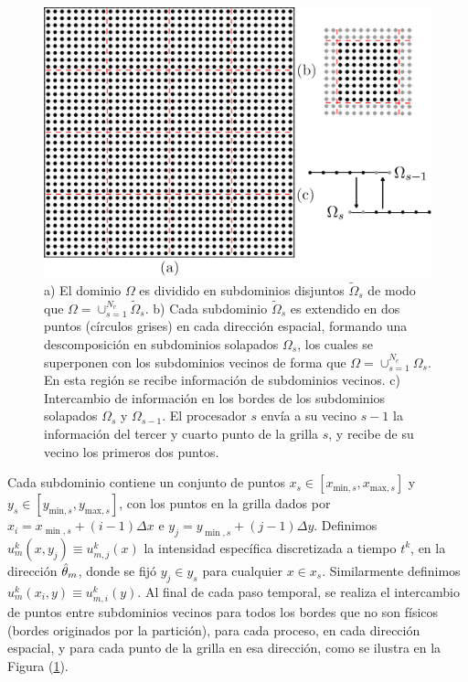 \begin{figure}[h!]
  \centering
  \includegraphics[width=0.6\linewidth]{figuras/all.png}
  \caption{a) El dominio $\Omega$ es dividido en subdominios disjuntos $\widetilde{\Omega}_s$ de modo que 
   $\Omega=\cup_{s=1}^{N_{c}}\widetilde{\Omega}_s$.
   b) Cada subdominio $\widetilde{\Omega}_s$ es extendido  
  en dos puntos (círculos grises) en cada dirección espacial, formando una descomposición en 
  subdominios solapados $\Omega_s$, los cuales se superponen con los subdominios vecinos 
  de forma que $\Omega=\cup_{s=1}^{N_{c}}\Omega_s$. 
  En esta región se recibe información de subdominios vecinos.
   c) Intercambio de información en los bordes de los subdominios solapados 
    $\Omega_s$ y $\Omega_{s-1}$. El 
   procesador $s$ envía a su vecino $s-1$ la información del tercer y cuarto punto de la grilla $s$, y 
   recibe de su vecino los primeros dos puntos.}
 \label{fig:bechange}
\end{figure}

 Cada subdominio contiene un conjunto de puntos  $x_s\in[x_{\text{min},s},x_{\text{max},s}]$ 
 y $y_s\in [y_{\text{min},s},y_{\text{max},s}]$, con los puntos 
 en la grilla dados por $x_i=x_{\min,s}+(i-1)\Delta x$ e $y_j=y_{\min,s}+(j-1)\Delta y$. 
 Definimos  $u_{m}^k(x,y_j)\equiv u_{m,j}^k(x)$ la intensidad específica discretizada a tiempo $t^k$, 
 en la dirección $\hat{\theta}_m$,
  donde se fijó $y_j\in y_s$ para cualquier $x\in x_s$. 
  Similarmente definimos $u_{m}^k(x_i,y)\equiv u_{m,i}^k(y)$. Al final de cada paso temporal, 
 se realiza el intercambio de puntos entre subdominios vecinos para todos los bordes que no son físicos (bordes 
 originados por la partición), 
 para cada proceso, en cada dirección espacial, y para cada punto de la grilla 
 en esa dirección, como se ilustra en la Figura (\ref{fig:bechange}).

